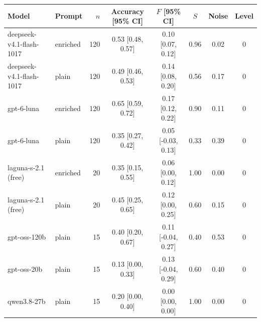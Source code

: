 \begin{tabular}{llrccccc}
\toprule
Model & Prompt & $n$ & Accuracy [95\% CI] & $F$ [95\% CI] & $S$ & Noise & Level \\
\midrule
deepseek-v4.1-flash-1017 & enriched & 120 & 0.53 [0.48, 0.57] & 0.10 [0.07, 0.12] & 0.96 & 0.02 & 0 \\
deepseek-v4.1-flash-1017 & plain & 120 & 0.49 [0.46, 0.53] & 0.14 [0.08, 0.20] & 0.56 & 0.17 & 0 \\
gpt-6-luna & enriched & 120 & 0.65 [0.59, 0.72] & 0.17 [0.12, 0.22] & 0.90 & 0.11 & 0 \\
gpt-6-luna & plain & 120 & 0.35 [0.27, 0.42] & 0.05 [-0.03, 0.13] & 0.33 & 0.39 & 0 \\
laguna-s-2.1 (free) & enriched & 20 & 0.35 [0.15, 0.55] & 0.06 [0.00, 0.12] & 1.00 & 0.00 & 0 \\
laguna-s-2.1 (free) & plain & 20 & 0.45 [0.25, 0.65] & 0.12 [0.00, 0.25] & 0.60 & 0.15 & 0 \\
gpt-oss-120b & plain & 15 & 0.40 [0.20, 0.67] & 0.11 [-0.04, 0.27] & 0.40 & 0.53 & 0 \\
gpt-oss-20b & plain & 15 & 0.13 [0.00, 0.33] & 0.13 [-0.04, 0.29] & 0.60 & 0.40 & 0 \\
qwen3.8-27b & plain & 15 & 0.20 [0.00, 0.40] & 0.00 [0.00, 0.00] & 1.00 & 0.00 & 0 \\
\bottomrule
\end{tabular}
